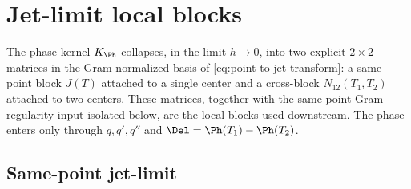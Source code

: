 %
%
%
%

\section{Jet-limit local blocks}
\label{sec:jet-limit-local-blocks}
\quad
{}\quad
{}\quad
{}\quad
{}\quad
{}
\par\medskip

The phase kernel \(K_\Ph\) collapses, in the limit \(h\to0\), into two
explicit \(2\times2\) matrices in the Gram-normalized basis of
\eqref{eq:point-to-jet-transform}: a same-point block \(J(T)\) attached
to a single center and a cross-block \(N_{12}(T_1,T_2)\) attached to two
centers.  These matrices, together with the same-point Gram-regularity input
isolated below, are the local blocks used downstream.  The phase enters only
through \(q,q',q''\) and \(\Del=\Ph(T_1)-\Ph(T_2)\).

\subsection{Same-point jet-limit}
\label{subsec:same-point-jet-limit}

